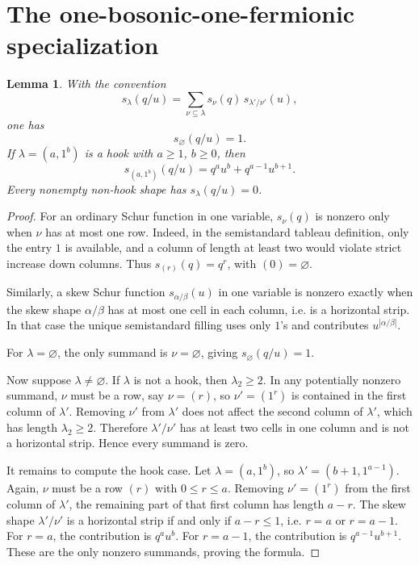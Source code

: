 \documentclass[12pt]{article}
\newtheorem{lemma}[theorem]{Lemma}
\begin{document}
\section{The one-bosonic-one-fermionic specialization}

\begin{lemma}\label{lem:super-schur}
With the convention
\[
s_\lambda(q/u)=\sum_{\nu\subseteq\lambda}s_\nu(q)\,s_{\lambda'/\nu'}(u),
\]
one has
\[
s_{\varnothing}(q/u)=1.
\]
If \(\lambda=(a,1^b)\) is a hook with \(a\ge 1\), \(b\ge 0\), then
\[
s_{(a,1^b)}(q/u)=q^a u^b+q^{a-1}u^{b+1}.
\]
Every nonempty non-hook shape has \(s_\lambda(q/u)=0\).
\end{lemma}

\begin{proof}
For an ordinary Schur function in one variable, \(s_\nu(q)\) is nonzero only when \(\nu\) has at most one row.  Indeed, in the semistandard tableau definition, only the entry \(1\) is available, and a column of length at least two would violate strict increase down columns.  Thus \(s_{(r)}(q)=q^r\), with \((0)=\varnothing\).

Similarly, a skew Schur function \(s_{\alpha/\beta}(u)\) in one variable is nonzero exactly when the skew shape \(\alpha/\beta\) has at most one cell in each column, i.e. is a horizontal strip.  In that case the unique semistandard filling uses only \(1\)'s and contributes \(u^{|\alpha/\beta|}\).

For \(\lambda=\varnothing\), the only summand is \(\nu=\varnothing\), giving \(s_{\varnothing}(q/u)=1\).

Now suppose \(\lambda\neq\varnothing\).  If \(\lambda\) is not a hook, then \(\lambda_2\ge 2\).  In any potentially nonzero summand, \(\nu\) must be a row, say \(\nu=(r)\), so \(\nu'=(1^r)\) is contained in the first column of \(\lambda'\).  Removing \(\nu'\) from \(\lambda'\) does not affect the second column of \(\lambda'\), which has length \(\lambda_2\ge 2\).  Therefore \(\lambda'/\nu'\) has at least two cells in one column and is not a horizontal strip.  Hence every summand is zero.

It remains to compute the hook case.  Let \(\lambda=(a,1^b)\), so \(\lambda'=(b+1,1^{a-1})\).  Again, \(\nu\) must be a row \((r)\) with \(0\le r\le a\).  Removing \(\nu'=(1^r)\) from the first column of \(\lambda'\), the remaining part of that first column has length \(a-r\).  The skew shape \(\lambda'/\nu'\) is a horizontal strip if and only if \(a-r\le 1\), i.e. \(r=a\) or \(r=a-1\).  For \(r=a\), the contribution is \(q^a u^b\).  For \(r=a-1\), the contribution is \(q^{a-1}u^{b+1}\).  These are the only nonzero summands, proving the formula.
\end{proof}
\end{document}
